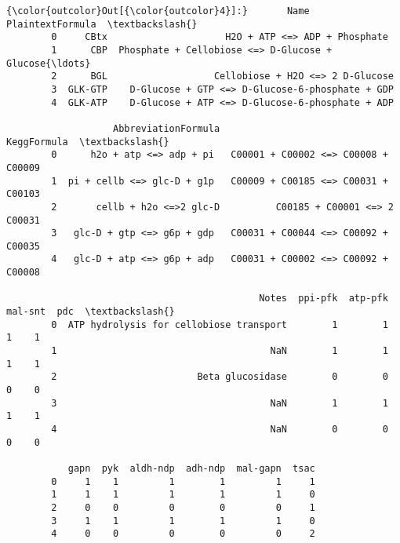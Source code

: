 \documentclass[11pt]{article}
\begin{document}
\begin{Verbatim}[commandchars=\\\{\}]
{\color{outcolor}Out[{\color{outcolor}4}]:}       Name                                   PlaintextFormula  \textbackslash{}
        0     CBtx                     H2O + ATP <=> ADP + Phosphate    
        1      CBP  Phosphate + Cellobiose <=> D-Glucose + Glucose{\ldots}   
        2      BGL                   Cellobiose + H2O <=> 2 D-Glucose   
        3  GLK-GTP    D-Glucose + GTP <=> D-Glucose-6-phosphate + GDP   
        4  GLK-ATP    D-Glucose + ATP <=> D-Glucose-6-phosphate + ADP   
        
                   AbbreviationFormula                           KeggFormula  \textbackslash{}
        0      h2o + atp <=> adp + pi   C00001 + C00002 <=> C00008 + C00009    
        1  pi + cellb <=> glc-D + g1p   C00009 + C00185 <=> C00031 + C00103    
        2       cellb + h2o <=>2 glc-D          C00185 + C00001 <=> 2 C00031   
        3   glc-D + gtp <=> g6p + gdp   C00031 + C00044 <=> C00092 + C00035    
        4   glc-D + atp <=> g6p + adp   C00031 + C00002 <=> C00092 + C00008    
        
                                             Notes  ppi-pfk  atp-pfk  mal-snt  pdc  \textbackslash{}
        0  ATP hydrolysis for cellobiose transport        1        1        1    1   
        1                                      NaN        1        1        1    1   
        2                         Beta glucosidase        0        0        0    0   
        3                                      NaN        1        1        1    1   
        4                                      NaN        0        0        0    0   
        
           gapn  pyk  aldh-ndp  adh-ndp  mal-gapn  tsac  
        0     1    1         1        1         1     1  
        1     1    1         1        1         1     0  
        2     0    0         0        0         0     1  
        3     1    1         1        1         1     0  
        4     0    0         0        0         0     2  
\end{Verbatim}
            
\end{document}
